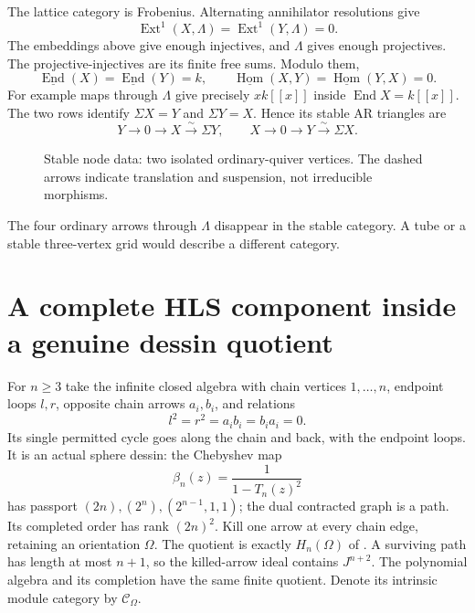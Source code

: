 The lattice category is Frobenius. Alternating annihilator resolutions give
\[
 \operatorname{Ext}^1(X,\Lambda)=\operatorname{Ext}^1(Y,\Lambda)=0.
\]
The embeddings above give enough injectives, and $\Lambda$ gives enough
projectives. The projective-injectives are its finite free sums. Modulo them,
\[
 \underline{\operatorname{End}}(X)=
 \underline{\operatorname{End}}(Y)=k,\qquad
 \underline{\operatorname{Hom}}(X,Y)=
 \underline{\operatorname{Hom}}(Y,X)=0.
\]
For example maps through $\Lambda$ give precisely $xk[[x]]$ inside
$\operatorname{End}X=k[[x]]$. The two rows identify
$\Sigma X=Y$ and $\Sigma Y=X$. Hence its stable AR triangles are
\[
 Y\to0\to X\xrightarrow{\sim}\Sigma Y,
 \qquad X\to0\to Y\xrightarrow{\sim}\Sigma X.
\]
\begin{figure}[htbp]\centering
{}
\caption{Stable node data: two isolated ordinary-quiver vertices. The dashed
arrows indicate translation and suspension, not irreducible morphisms.}
\end{figure}
The four ordinary arrows through $\Lambda$ disappear in the stable category.
A tube or a stable three-vertex grid would describe a different category.

\section[An HLS component in a dessin quotient]{A complete HLS component inside a genuine dessin quotient}
For $n\ge3$ take the infinite closed algebra with chain vertices $1,\ldots,n$,
endpoint loops $l,r$, opposite chain arrows $a_i,b_i$, and relations
\[
 l^2=r^2=a_ib_i=b_ia_i=0.
\]
Its single permitted cycle goes along the chain and back, with the endpoint
loops. It is an actual sphere dessin: the Chebyshev map
\[
 \beta_n(z)=\frac{1}{1-T_n(z)^2}
\]
has passport $(2n),(2^n),(2^{n-1},1,1)$; the dual contracted graph is a path.
Its completed order has rank $(2n)^2$. Kill one arrow at every chain edge,
retaining an orientation $\Omega$. The quotient is exactly $H_n(\Omega)$ of
\cite{ARBHLS}. A surviving path has length at most $n+1$, so the killed-arrow
ideal contains $J^{n+2}$. The polynomial algebra and its completion have the
same finite quotient. Denote its intrinsic module category by $\mathcal C_\Omega$.

